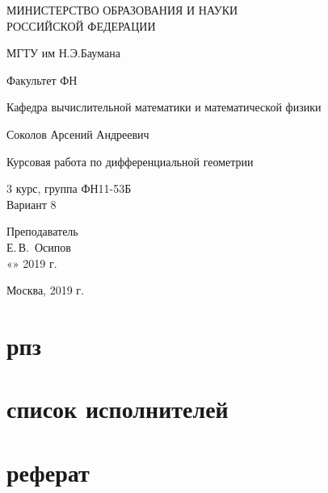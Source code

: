 \documentclass[14pt,a4paper]{extarticle}
\makeatletter
\renewcommand\tableofcontents{%
	\normalfont\null\hfill\normalfont{\normalfont\contentsname}\hfill\null\par
	\@mkboth{\normalfont\contentsname}{\normalfont\contentsname}%
	\@starttoc{toc}%
}
\makeatother
\begin{document}
	\begin{titlepage}
	\begin{center}
		\large
		МИНИСТЕРСТВО ОБРАЗОВАНИЯ И НАУКИ\\ РОССИЙСКОЙ ФЕДЕРАЦИИ
		
		\vspace{0.5cm}
		
		МГТУ им Н.Э.Баумана
		\vspace{0.25cm}
		
		Факультет ФН
		
		Кафедра вычислительной математики и математической физики
		\vfill
		
		
		Соколов Арсений Андреевич\\
		\vfill
		
		
		{\LARGE Курсовая работа по дифференциальной геометрии\\[2mm]
		}
		\bigskip
		
		3 курс, группа ФН11-53Б\\
		Вариант 8
	\end{center}
	\vfill
	
	\newlength{\ML}
	\hfill\begin{minipage}{0.4\textwidth}
		Преподаватель\\
		\underline{\hspace{3cm}} Е.\,В.~Осипов\\
		«\underline{\hspace{0.7cm}}» \underline{\hspace{1.71cm}} 2019 г.
	\end{minipage}%
	\bigskip
	
	
	\vfill
	
	\begin{center}
		Москва, 2019 г.
	\end{center}
\end{titlepage}
\tableofcontents
\parindent=1.25cm
\clearpage


\section*{рпз}
\newpage
\section*{список исполнителей}
\newpage
\section*{реферат}
\newpage
\end{document}
